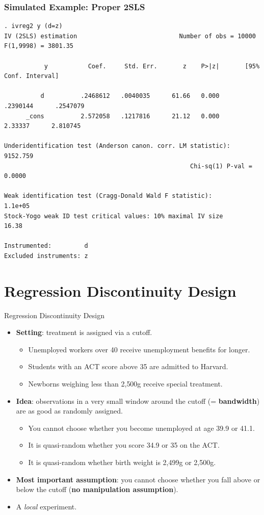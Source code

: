 \documentclass[11pt,aspectratio=169]{beamer}
\begin{document}
\begin{frame}[fragile]
  \frametitle{Simulated Example: Proper 2SLS}
{\tiny
\begin{verbatim}
. ivreg2 y (d=z)
IV (2SLS) estimation                            Number of obs = 10000   F(1,9998) = 3801.35

           y           Coef.     Std. Err.       z    P>|z|       [95% Conf. Interval]

          d          .2468612   .0040035      61.66   0.000       .2390144      .2547079
      _cons          2.572058   .1217816      21.12   0.000        2.33337      2.810745

Underidentification test (Anderson canon. corr. LM statistic):                  9152.759
                                                   Chi-sq(1) P-val =              0.0000

Weak identification test (Cragg-Donald Wald F statistic):                        1.1e+05
Stock-Yogo weak ID test critical values: 10% maximal IV size                       16.38

Instrumented:         d
Excluded instruments: z
\end{verbatim}
}
\end{frame}

\section{Regression Discontinuity Design}

\begin{frame}{Regression Discontinuity Design}
  \begin{itemize}
    \item \textbf{Setting}: treatment is assigned via a cutoff.
    \begin{itemize}
      \item Unemployed workers over 40 receive unemployment benefits for longer.
      \item Students with an ACT score above 35 are admitted to Harvard.
      \item Newborns weighing less than 2{,}500g receive special treatment.
    \end{itemize}
    \item \textbf{Idea}: observations in a very small window around the cutoff (= \textbf{bandwidth}) are as good as randomly assigned.
    \begin{itemize}
      \item You cannot choose whether you become unemployed at age 39.9 or 41.1.
      \item It is quasi-random whether you score 34.9 or 35 on the ACT.
      \item It is quasi-random whether birth weight is 2{,}499g or 2{,}500g.
    \end{itemize}
    \item \textbf{Most important assumption}: you cannot choose whether you fall above or below the cutoff (\textbf{no manipulation assumption}).
    \item A \emph{local} experiment.
  \end{itemize}
\end{frame}
\end{document}
